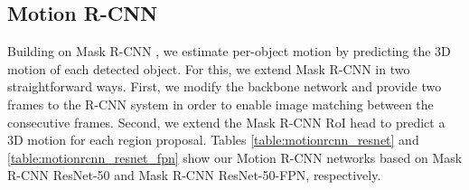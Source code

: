 
\subsection{Motion R-CNN}
\label{ssec:model}

Building on Mask R-CNN \cite{MaskRCNN},
we estimate per-object motion by predicting the 3D motion of each detected object.
For this, we extend Mask R-CNN in two straightforward ways.
First, we modify the backbone network and provide two frames to the R-CNN system
in order to enable image matching between the consecutive frames.
Second, we extend the Mask R-CNN RoI head to predict a 3D motion for each
region proposal. Tables \ref{table:motionrcnn_resnet} and \ref{table:motionrcnn_resnet_fpn}
show our Motion R-CNN networks based on Mask R-CNN ResNet-50 and Mask R-CNN ResNet-50-FPN,
respectively.

